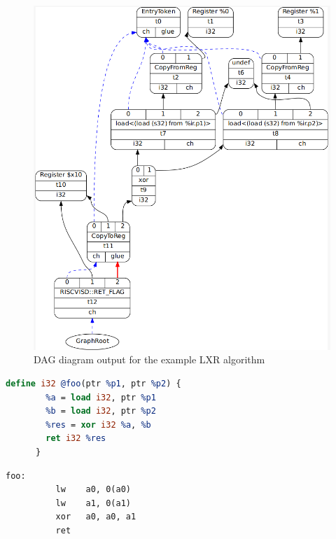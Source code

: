\begin{figure}
    \centering
    \includegraphics[scale=0.4]{adding_new_instr/lxr_dag_diagram.png}
    \caption{DAG diagram output for the example LXR algorithm}
    \label{fig:lxr_dag_diagram}
\end{figure}

\begin{minipage}{\linewidth}
\begin{lstlisting}[caption={IR code input for LXR algorithm}, language=llvm, style=nasm]
    define i32 @foo(ptr %p1, ptr %p2) {
        %a = load i32, ptr %p1
        %b = load i32, ptr %p2
        %res = xor i32 %a, %b
        ret i32 %res
      }
\end{lstlisting}
\end{minipage}


\begin{lstlisting}[caption= Assembly output without LXR instruction]
      foo:                 
          lw	a0, 0(a0)
          lw	a1, 0(a1)
          xor	a0, a0, a1
          ret
\end{lstlisting}


